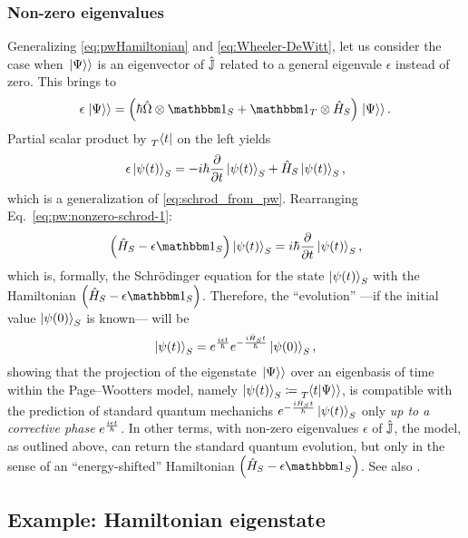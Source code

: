 \subsubsection{Non-zero eigenvalues}
Generalizing \eqref{eq:pwHamiltonian} and \eqref{eq:Wheeler-DeWitt}, let us consider the case when
$\left.\left| \Psi \right\rangle\right\rangle$ is an eigenvector of $\hat{\mathbb{J}}$ related to a general eigenvale $\epsilon$
instead of zero. This brings to
\begin{equation}\label{eq:pw:non0e:first}
  \epsilon \dket{\Psi} = \qty(\hbar\op{\Omega} \ox \idop_S + \idop_T \ox \op{H}_S) \dket{\Psi} \text{.}
\end{equation}
Partial scalar product by $\prescript{}{T}{\bra{t}}$ on the left yields
\begin{equation}\label{eq:pw:nonzero-schrod-1}
  \epsilon\ket{\psi(t)}_{S} = -i\hbar\pdv{t}\ket{\psi(t)}_{S} + \hat{H}_S\ket{\psi(t)}_{S}
  \text{,}
\end{equation}
which is a generalization of \eqref{eq:schrod_from_pw}.
Rearranging Eq.~\eqref{eq:pw:nonzero-schrod-1}:
\begin{equation}\label{eq:pw:nonzero-schrod-2}
   \qty(\op{H}_S - \epsilon \idop_{S}) \ket{\psi(t)}_{S} = i\hbar\pdv{t}\ket{\psi(t)}_{S}
   \text{,}
\end{equation}
which is, formally, the Schr\"{o}dinger equation
for the state $\ket{\psi(t)}_{S}$ with
the Hamiltonian $\qty(\op{H}_S - \epsilon \idop_{S})$.
Therefore, the ``evolution''
---if the initial value $\ket{\psi(0)}_S$ is known---
will be
\begin{equation}\label{eq:pw:non0e:last}
  \ket{\psi(t)}_S = e^{\frac{i \epsilon t}{\hbar}} e^{-\frac{i \hat{H}_{S} t}{\hbar}} \ket{\psi(0)}_S
  \text{,}
\end{equation}
showing that the projection of the eigenstate $\left.\left| \Psi \right\rangle\right\rangle$ over an eigenbasis of time within the Page--Wootters model,
namely $\ket{\psi(t)}_S \coloneqq \prescript{}{T}{\!\left.\left\langle t \middle| \Psi \right\rangle\right\rangle}$,
is compatible with the prediction of standard quantum mechanichs $e^{-\frac{i \hat{H}_{S} t}{\hbar}} \ket{\psi(t)}_S$
only \emph{up to a corrective phase} $e^{\frac{i \epsilon t}{\hbar}}$.
In other terms, with non-zero eigenvalues $\epsilon$ of $\hat{\mathbb{J}}$,
the model, as outlined above, can return the standard quantum evolution, but
only in the sense of
an ``energy-shifted'' Hamiltonian $\qty(\op{H}_S - \epsilon \idop_{S})$.
See also \cite[\it ``The Zero-eigenvalue'']{Lloyd:Time}.

\subsection{Example: Hamiltonian eigenstate}\label{sec:pw:ex-hamiltonian-eigenstate}

